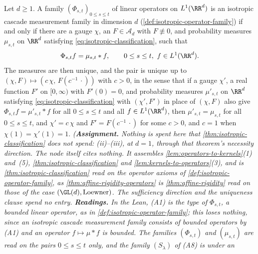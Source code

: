 \begin{theorem}
\label{cor:isotropic-classification-operators}
\leanok
Let $d \ge 1$. A family $(\Phi_{s,t})_{0 \le s \le t}$ of linear operators on $L^1(\RR^d)$ is an
isotropic cascade measurement family in dimension $d$ (\ref{def:isotropic-operator-family}) if and
only if there are a gauge $\chi$, an $F \in \mathcal{A}_d$ with $F \not\equiv 0$, and probability
measures $\mu_{s,t}$ on $\RR^d$ satisfying \ref{eq:isotropic-classification}, such that
\[
  \Phi_{s,t}f = \mu_{s,t} * f, \qquad 0 \le s \le t,\ f \in L^1(\RR^d) .
\]
The measures are then unique, and the pair is unique up to
$(\chi,F) \mapsto (c\,\chi,\,F(c^{-1}\,\cdot))$ with $c > 0$, in the sense that if a gauge $\chi'$,
a real function $F'$ on $[0,\infty)$ with $F'(0) = 0$, and probability measures $\mu'_{s,t}$ on
$\RR^d$ satisfying \ref{eq:isotropic-classification} with $(\chi', F')$ in place of $(\chi, F)$
also give $\Phi_{s,t}f = \mu'_{s,t} * f$ for all $0 \le s \le t$ and all $f \in L^1(\RR^d)$, then
$\mu'_{s,t} = \mu_{s,t}$ for all $0 \le s \le t$, and $\chi' = c\,\chi$ and
$F' = F(c^{-1}\,\cdot)$ for some $c > 0$, and $c = 1$ when $\chi(1) = \chi'(1) = 1$.
\statusA\quad{}\quad\emph{(\textbf{Assignment.} Nothing is spent here that
\ref{thm:isotropic-classification} does not spend: (ii)--(iii), at $d = 1$, through that
theorem's necessity direction. The node itself cites nothing. It assembles
\ref{lem:operators-to-kernels}(1) and~(5), \ref{thm:isotropic-classification} and
\ref{lem:kernels-to-operators}(3), and is \ref{thm:isotropic-classification} read on the operator
axioms of \ref{def:isotropic-operator-family}, as \ref{thm:affine-rigidity-operators} is
\ref{thm:affine-rigidity} read on those of the case $(\GL(d), \text{Loewner})$. The sufficiency
direction and the uniqueness clause spend no entry. \textbf{Readings.} In the Lean, (A1) is the
type of $\Phi_{s,t}$, a bounded linear operator, as in \ref{def:isotropic-operator-family}; this
loses nothing, since an isotropic cascade measurement family consists of bounded operators by (A1)
and an operator $f \mapsto \mu * f$ is bounded. The families $(\Phi_{s,t})$ and $(\mu_{s,t})$ are
read on the pairs $0 \le s \le t$ only, and the family $(S_\lambda)$ of (A8) is under an
}
\end{theorem}
